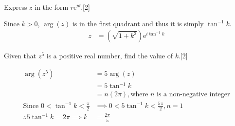 \documentclass[12pt, a4 paper]{article}
\begin{document}
\begin{outline}[enumerate]
	\2 Express $z$ in the form $r\mathrm{e}^{i\theta}$.\hfill[2]
	\begin{answer}
		Since $k>0$, $\arg{(z)}$ is in the first quadrant and thus it is simply $\tan^{-1}k$.
		\begin{align*}
			z & = (\sqrt{1+k^2})\mathrm{e}^{i\tan^{-1}k}
		\end{align*}
	\end{answer}
	\2 Given that $z^5$ is a positive real number, find the value of $k$.\hfill[2]
	\begin{answer}
		\begin{align*}
			\arg{(z^5)}                               & = 5\arg{(z)}                                                     \\
			                                          & = 5\tan^{-1}k                                                    \\
			                                          & = n(2\pi), \textrm{where } n \textrm{ is a non-negative integer} \\
			\textrm{Since }0<\tan^{-1}k<\frac{\pi}{2} & \implies0<5\tan^{-1}k<\frac{5\pi}{2}, n=1                        \\
			\therefore 5\tan^{-1}k=2\pi \implies k    & =\frac{2\pi}{5}
		\end{align*}
	\end{answer}


\end{outline}
\end{document}
